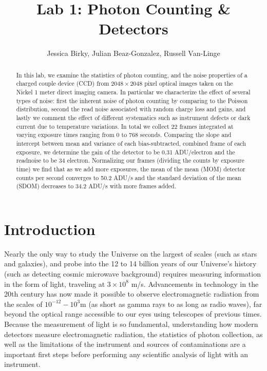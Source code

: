 \documentclass[preprint]{aastex62}
\begin{document}
\title{\sc Lab 1: Photon Counting \& Detectors}
\author{Jessica Birky, Julian Beaz-Gonzalez, Russell Van-Linge}


\begin{abstract}
In this lab, we examine the statistics of photon counting, and the noise properties of a charged couple device (CCD) from $2048\times2048$ pixel optical images taken on the Nickel 1 meter direct imaging camera. In particular we characterize the effect of several types of noise: first the inherent noise of photon counting by comparing to the Poisson distribution, second the read noise associated with random charge loss and gains, and lastly we comment the effect of different systematics such as instrument defects or dark current due to temperature variations. In total we collect 22 frames integrated at varying exposure times ranging from 0 to 768 seconds. Comparing the slope and intercept between mean and variance of each bias-subtracted, combined frame of each exposure, we determine the gain of the detector to be 0.31 ADU/electron and the readnoise to be 34 electron. Normalizing our frames (dividing the counts by exposure time) we find that as we add more exposures, the mean of the mean (MOM) detector counts per second converges to 50.2 ADU/s and the standard deviation of the mean (SDOM) decreases to 34.2 ADU/s with more frames added.

\end{abstract}
\bigskip

\section{Introduction} 
Nearly the only way to study the Universe on the largest of scales (such as stars and galaxies), and probe into the 12 to 14 billion years of our Universe's history (such as detecting cosmic microwave background) requires measuring information in the form of light, traveling at $3\times10^8$ m/s. Advancements in technology in the 20th century has now made it possible to observe electromagnetic radiation from the scales of $10^{-12}-10^3$m (as short as gamma rays to as long as radio waves), far beyond the optical range accessible to our eyes using telescopes of previous times. Because the measurement of light is so fundamental, understanding how modern detectors measure electromagnetic radiation, the statistics of photon collection, as well as the limitations of the instrument and sources of contaminations are a important first steps before performing any scientific analysis of light with an instrument.
\end{document}
